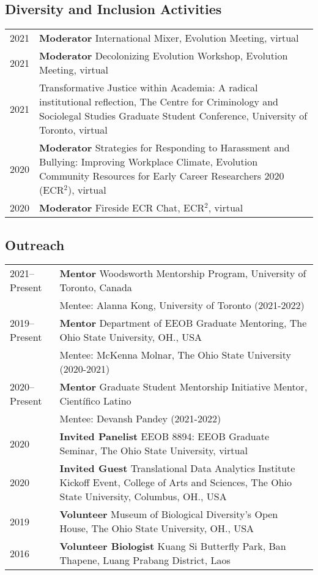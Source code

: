 \documentclass[11pt]{article}
\begin{document}
\subsection*{Diversity and Inclusion Activities}
\begin{longtable}{p{}  p{}}
2021& \textbf{Moderator} International Mixer, Evolution Meeting, virtual\\
2021& \textbf{Moderator} Decolonizing Evolution Workshop, Evolution Meeting, virtual\\
2021 & Transformative Justice within Academia: A radical institutional reflection, The Centre for Criminology and Sociolegal Studies Graduate Student Conference, University of Toronto, virtual\\
2020 &	\textbf{Moderator} Strategies for Responding to Harassment and Bullying: Improving Workplace Climate, Evolution Community Resources for Early Career Researchers 2020 (ECR$^2$), virtual\\
2020 &	\textbf{Moderator} Fireside ECR Chat, ECR$^2$, virtual\\
\end{longtable}


\subsection*{Outreach}
\begin{longtable}{p{}  p{}}
2021--Present & \textbf{Mentor} Woodsworth Mentorship Program, University of Toronto, Canada\\
		       &Mentee: Alanna Kong, University of Toronto (2021-2022)\\
2019--Present & \textbf{Mentor} Department of EEOB Graduate Mentoring, The Ohio State University, OH., USA \\
		       &Mentee: McKenna Molnar, The Ohio State University (2020-2021)\\
2020--Present& \textbf{Mentor} Graduate Student Mentorship Initiative Mentor, Científico Latino\\
			&Mentee: Devansh Pandey (2021-2022)\\
2020 &	\textbf{Invited Panelist} EEOB 8894: EEOB Graduate Seminar, The Ohio State University, virtual\\
2020 &	\textbf{Invited Guest} Translational Data Analytics Institute Kickoff Event, College of Arts and Sciences, The Ohio State University, Columbus, OH., USA\\
2019 & \textbf{Volunteer} Museum of Biological Diversity’s Open House, The Ohio State University, OH., USA\\
2016 &  \textbf{Volunteer Biologist} Kuang Si Butterfly Park, Ban Thapene, Luang Prabang District, Laos\vspace{5pt}\\
\end{longtable}
\end{document}
